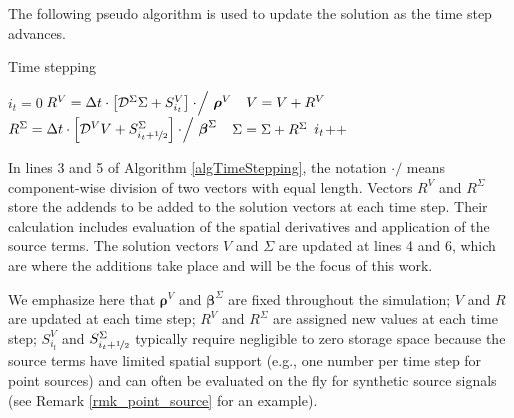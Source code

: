 \documentclass[10pt]{article}
\begin{document}
The following pseudo algorithm is used to update the solution as the time step advances.
%
\begin{algorithm}[H]
\caption{Time stepping}
\label{algTimeStepping}
\begin{algorithmic}[1]
\State $i_t=0$
\State $\hphantom{\hspace{1.35em}}\mathllap{R^V} = \Delta t \cdot \left[\mathcal D^\Sigma \Sigma + S^V_{i_t} \right] \cdot\!\Big/ \ \boldsymbol \rho^V$ 
%
\State $\hphantom{\hspace{1.35em}}\mathllap{V} = V + R^V$ 
%
\State $\hphantom{\hspace{1.35em}}\mathllap{R^\Sigma} = \Delta t \cdot \left[\mathcal D^V V + S^\Sigma_{i_t + \nicefrac{1}{2}} \right] \cdot\!\Big/ \ \boldsymbol \beta^\Sigma$
%
\State $\hphantom{\hspace{1.35em}}\mathllap{\Sigma} = \Sigma + R^\Sigma$ 
%
\State $\hphantom{\hspace{0.75em}}\mathllap{i_t}$++ 
%
\EndWhile
\end{algorithmic}
\end{algorithm}

In lines 3 and 5 of Algorithm \ref{algTimeStepping}, the notation $\cdot/$ means component-wise division of two vectors with equal length. 
%
Vectors $R^V$ and $R^\Sigma$ store the addends to be added to the solution vectors at each time step. Their calculation includes evaluation of the spatial derivatives and application of the source terms. 
%
The solution vectors $V$ and $\Sigma$ are updated at lines 4 and 6, which are where the additions take place and will be the focus of this work. 


We emphasize here that $\boldsymbol \rho^V$ and $\boldsymbol \beta^\Sigma$ are fixed throughout the simulation; $V$ and $R$ are updated at each time step; $R^V$ and $R^\Sigma$ are assigned new values at each time step; $S^V_{i_t}$ and $S^\Sigma_{i_t + \nicefrac{1}{2}}$ typically require negligible to zero storage space because the source terms have limited spatial support (e.g., one number per time step for point sources) and can often be evaluated on the fly for synthetic source signals (see Remark \ref{rmk_point_source} for an example).
\end{document}
